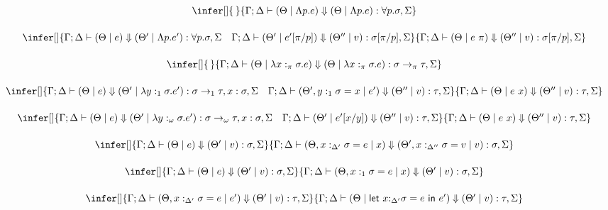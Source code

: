 \documentclass[acmsmall,review,anonymous,screen]{acmart}
\newcommand{\llet}[2]{\mathsf{let}~#1~\mathsf{in}~#2}
\begin{document}
\[
  \begin{array}{c}
    \infer[]
    {\,}
    {\Gamma;\Delta \vdash (\Theta \mid \Lambda p.e) \Downarrow (\Theta \mid
    \Lambda p.e) : \forall p . \sigma , \Sigma }
    \\[1.5em]
    \infer[]
    {\Gamma ; \Delta \vdash (\Theta \mid  e) \Downarrow (\Theta' \mid
    \Lambda p.e') : \forall p . \sigma , \Sigma \quad \Gamma ;\Delta \vdash
      (\Theta' \mid e'[\pi/p]) \Downarrow (\Theta'' \mid v) : \sigma[\pi/p], \Sigma}
    {\Gamma ; \Delta \vdash (\Theta \mid e~\pi) \Downarrow (\Theta''
      \mid v) : \sigma[\pi/p] , \Sigma  }\\[1.5em]
    \infer[]
    {\,}
    {\Gamma ;\Delta \vdash (\Theta \mid \lambda x:_\pi \sigma . e)
    \Downarrow (\Theta \mid \lambda x:_\pi\sigma .e) : \sigma
    \rightarrow_\pi \tau,\Sigma }\\[1.5em]
    \infer[]
    {\Gamma;\Delta \vdash  (\Theta \mid e) \Downarrow (\Theta' \mid
    \lambda y:_1 \sigma . e') : \sigma \rightarrow_1 \tau , x:\sigma, \Sigma
    \quad
    \Gamma ; \Delta \vdash (\Theta' , y:_{1} \sigma = x \mid e') \Downarrow (\Theta''
    \mid v) : \tau , \Sigma  }
    {\Gamma ; \Delta\vdash (\Theta \mid  e~x ) \Downarrow (\Theta''
    \mid v) : \tau , \Sigma }\\[1.5em]
        \infer[]
    {\Gamma;\Delta \vdash  (\Theta \mid e) \Downarrow (\Theta' \mid
    \lambda y:_\omega \sigma . e') : \sigma \rightarrow_\omega \tau , x:\sigma, \Sigma
    \quad
            \Gamma ; \Delta \vdash (\Theta' \mid e'[x/y]) \Downarrow (\Theta''
    \mid v) : \tau , \Sigma  }
    {\Gamma ; \Delta\vdash (\Theta \mid  e~x ) \Downarrow (\Theta''
    \mid v) : \tau , \Sigma }\\[1.5em]
       \infer[]
    {\Gamma ; \Delta  \vdash (\Theta \mid e)
    \Downarrow (\Theta' \mid v) : \sigma , \Sigma}
    {\Gamma ; \Delta \vdash (\Theta , x:_{\Delta'} \sigma = e \mid x)
      \Downarrow (\Theta' , x:_{\Delta''} \sigma = v \mid v) : \sigma, \Sigma}
    \\[1.5em]
           \infer[]
    {\Gamma ;\Delta  \vdash (\Theta \mid e)
    \Downarrow (\Theta' \mid v) : \sigma,\Sigma}
    {\Gamma ; \Delta \vdash (\Theta , x:_1 \sigma = e \mid x)
    \Downarrow (\Theta' \mid v) : \sigma,\Sigma}
    \\[1.5em]
    
    \infer[]
    {\Gamma ;\Delta \vdash (\Theta,x:_{\Delta'} \sigma = e \mid e')
    \Downarrow (\Theta' \mid v) : \tau,\Sigma}
    {\Gamma ; \Delta \vdash (\Theta \mid \llet{x{:}_{\Delta'}\sigma =
    e}{e'})\Downarrow (\Theta' \mid v) : \tau , \Sigma
    }\\[1.5em]
    

\end{array}\]
\end{document}
